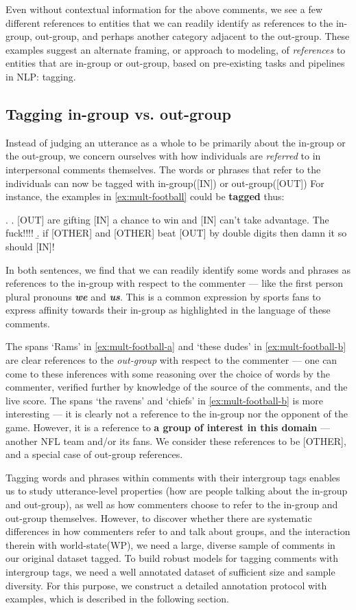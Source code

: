 Even without contextual information for the above comments, we see a few different references to entities that we can readily identify as references to the in-group, out-group, and perhaps another category adjacent to the out-group. These examples suggest an alternate framing, or approach to modeling, of \emph{references} to entities that are in-group or out-group, based on pre-existing tasks and pipelines in NLP: tagging.

\subsection{Tagging in-group vs. out-group}

Instead of judging an utterance as a whole to be primarily about the in-group or the out-group, we concern ourselves with how individuals are \emph{referred} to in interpersonal comments themselves. The words or phrases that refer to the individuals can now be tagged with in-group([IN]) or out-group([OUT]) For instance, the examples in \ref{ex:mult-football} could be \textbf{tagged} thus:

\ex. \a. [OUT] are gifting [IN] a chance to win and [IN] can’t take advantage. The fuck!!!!
     \b. if [OTHER] and [OTHER] beat [OUT] by double digits then damn it so should [IN]!
     
     
In both sentences, we find that we can readily identify some words and phrases as references to the in-group with respect to the commenter --- like the first person plural pronouns \textbf{\emph{we}} and \textbf{\emph{us}}. This is a common expression by sports fans to express affinity towards their in-group as highlighted in the language of these comments.

The spans `Rams' in \ref{ex:mult-football-a} and `these dudes' in \ref{ex:mult-football-b} are clear references to the \emph{out-group} with respect to the commenter --- one can come to these inferences with some reasoning over the choice of words by the commenter, verified further by knowledge of the source of the comments, and the live score. The spans `the ravens' and `chiefs' in \ref{ex:mult-football-b} is more interesting --- it is clearly not a reference to the in-group nor the opponent of the game. However, it is a reference to \textbf{a group of interest in this domain} --- another NFL team and/or its fans. We consider these references to be [OTHER], and a special case of out-group references.

Tagging words and phrases within comments with their intergroup tags enables us to study utterance-level properties (how are people talking about the in-group and out-group), as well as how commenters choose to refer to the in-group and out-group themselves. However, to discover whether there are systematic differences in how commenters refer to and talk about groups, and the interaction therein with world-state(WP), we need a large, diverse sample of comments in our original dataset tagged. To build robust models for tagging comments with intergroup tags, we need a well annotated dataset of sufficient size and sample diversity. For this purpose, we construct a detailed annotation protocol with examples, which is described in the following section.

